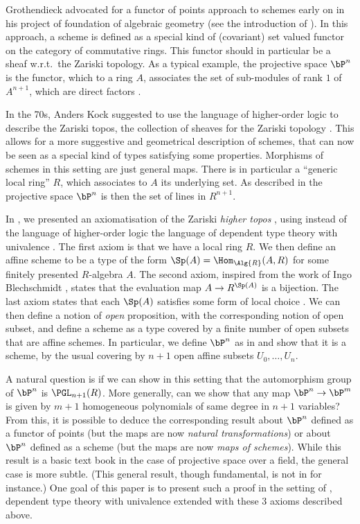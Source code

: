 Grothendieck advocated for a functor of points approach to schemes early on in his
project of foundation of algebraic geometry (see the introduction of \cite{EGAI}).
In this approach, a scheme is defined as a special kind of (covariant) set valued functor
on the category of commutative rings. This functor should in particular
be a sheaf w.r.t.\ the Zariski topology. As a typical example, the projective space $\bP^n$
is the functor, which to a ring $A$,
associates the set of sub-modules of  rank $1$ of $A^{n+1}$, which are direct factors \cite{Demazure,Eisenbud,Jantzen}.

In the 70s, Anders Kock suggested to use the language of higher-order logic \cite{Church40}
to describe the Zariski topos, the collection of sheaves for the Zariski topology \cite{Kock74,kockreyes}.
This allows for
a more suggestive and geometrical description of schemes, that can now be seen as a special kind
of types satisfying some properties. Morphisms of schemes in this setting are just general maps.
There is in particular a ``generic
local ring'' $R$, which associates to $A$ its underlying set. As described in \cite{kockreyes}
the projective space $\bP^n$ is then the set of lines in $R^{n+1}$.

In \cite{draft}, we presented an axiomatisation of the Zariski {\em higher topos} \cite{lurie-htt},
using instead of the language of higher-order logic the language of dependent type theory
with univalence \cite{hott}. The first axiom is that we have a local ring $R$. We then define
an affine scheme to be a type of the form $\Sp(A) = \Hom_{\Alg{R}}(A,R)$ for some finitely presented
$R$-algebra $A$. The second axiom, inspired from the work of Ingo Blechschmidt \cite{ingo-thesis},
states that the evaluation map $A\rightarrow R^{\Sp(A)}$ is a bijection. The last axiom states
that each $\Sp(A)$ satisfies some form of local choice \cite{draft}. We can then define a notion
of {\em open} proposition, with the corresponding notion of open subset, and define a scheme as a type
covered by a finite number of open subsets that are affine schemes. In particular, we define
$\bP^n$ as in \cite{kockreyes} and show that it is a scheme, by the usual covering by $n+1$
open affine subsets $U_0,\dots,U_n$.

A natural question is if we can show in this setting that the automorphism group of $\bP^n$
is  $\PGL_{n+1}(R)$.
More generally, can we show that any map $\bP^n\rightarrow \bP^m$ is given by $m+1$ homogeneous
polynomials of same degree in $n+1$ variables?
From this, it is possible to deduce the corresponding result about $\bP^n$ defined as
a functor of points (but the maps are now {\em natural transformations}) or about $\bP^n$ defined
as a scheme (but the maps are now {\em maps of schemes}).
While this result is a basic text book in the case of projective space over a field, the general
case is more subtle.
(This general result, though fundamental, is not in \cite{Hartshorne} for instance.)
One goal of this paper is to present such a proof in the setting of \cite{draft},
dependent type theory with univalence extended with these 3 axioms described above.

